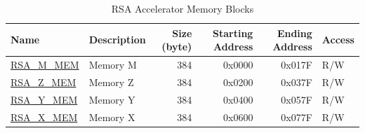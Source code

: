 \begin{longtable}{ | l | l | r | r | r | l | }
\caption{RSA Accelerator Memory Blocks} \label{regdesc:RSAmemory}
\\ \hline
\rowcolor{lightgray}
\textbf{Name} & \textbf{Description}  &  \textbf{Size (byte)}  &  \textbf{Starting Address}  &  \textbf{Ending Address}  & \textbf{Access}   \\ \hline

\hyperref[regdesc:RSAmemory]{RSA\_M\_MEM} & Memory M  & 384  & 0x0000 & 0x017F & R/W \\ \hline
\hyperref[regdesc:RSAmemory]{RSA\_Z\_MEM} & Memory Z  & 384  & 0x0200 & 0x037F & R/W \\ \hline
\hyperref[regdesc:RSAmemory]{RSA\_Y\_MEM} & Memory Y  & 384  & 0x0400 & 0x057F & R/W \\ \hline
\hyperref[regdesc:RSAmemory]{RSA\_X\_MEM} & Memory X  & 384  & 0x0600 & 0x077F & R/W \\ \hline

\end{longtable}
